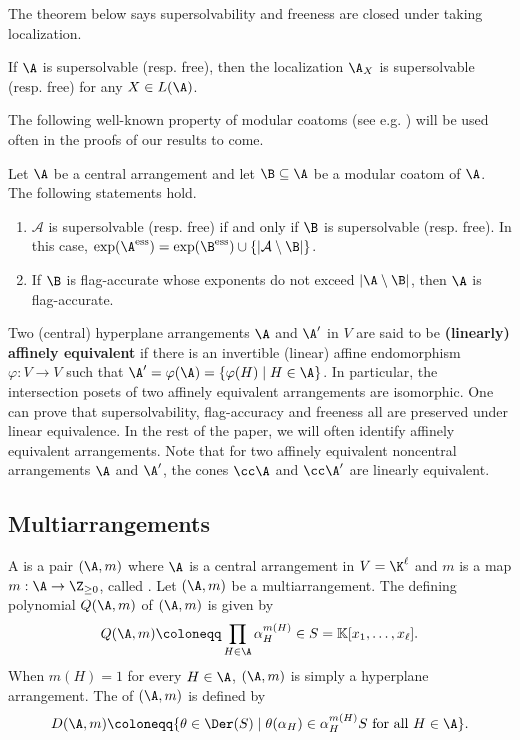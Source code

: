  The theorem below says supersolvability and freeness are closed under taking localization. 
 
  \begin{theorem}
 \label{thm:localization-ss-free}
 If $\A$ is  supersolvable (resp. free), then the localization $\A_X$ is  supersolvable (resp. free) for  any $X \in L(\A)$.
 \end{theorem}

 
The following well-known property of modular coatoms (see e.g. \cite[Proposition 3.3]{MRT24}) will be used often in the proofs of our results to come.
 \begin{proposition} 
 \label{prop:modular coatom}
 Let $\A$ be a central arrangement and let  $\B\subseteq \A$ be a modular coatom of $\A$. 
The following statements hold.
\begin{enumerate}[(1)]
\item $ \mathcal{A} $ is supersolvable (resp. free) if and only if $ \B $ is supersolvable (resp. free).
In this case, $ \exp (\A^{\mathrm{ess}}) = \exp (\B^{\mathrm{ess}} ) \cup \{|\mathcal{A}\setminus\B|\} $. 
\item  If  $\B$ is flag-accurate whose exponents do not exceed  $|\A\setminus\B|$, then $ \A $ is flag-accurate.
\end{enumerate}
\end{proposition}
 

Two (central) hyperplane arrangements $\A$ and $\A'$ in $V$ are said to be \textbf{(linearly) affinely equivalent} if there is an invertible (linear) affine endomorphism $\varphi: V \to V$ such that $\A'=\varphi(\A)=\{\varphi(H)\mid H\in \A\}$. 
In particular, the intersection posets of two affinely equivalent arrangements are isomorphic. 
One can prove that supersolvability, flag-accuracy and freeness all are preserved under linear equivalence. 
In the rest of the paper, we will often identify affinely equivalent arrangements. 
Note that for  two  affinely equivalent noncentral arrangements $\A$ and $\A'$, the cones $\cc\A$ and $\cc\A'$ are linearly equivalent. 

\subsection{Multiarrangements}
\label{subsec:multi}
A  is a pair $(\A, m)$ where $\A$ is a central arrangement in $V=\K^\ell$ and $m$ is a map $m : \A \to \Z_{\ge0}$, called . 
Let $(\A, m)$ be a multiarrangement.
The defining polynomial $Q(\A,m)$ of $(\A, m)$ is given by 
$$Q(\A,m) \coloneqq  \prod_{H \in \A} \alpha^{m(H)}_H \in S= \mathbb{K}[x_{1}, \dots, x_{\ell}].$$
When $m(H) = 1$ for every $H \in \A$, $(\A,m)$ is simply a hyperplane arrangement. 
The  of  $(\A, m)$ is defined by
$$D(\A,m) \coloneqq   \{ \theta\in \Der(S) \mid \theta(\alpha_H) \in \alpha^{m(H)}_HS \mbox{ for all } H \in \A\}.$$

